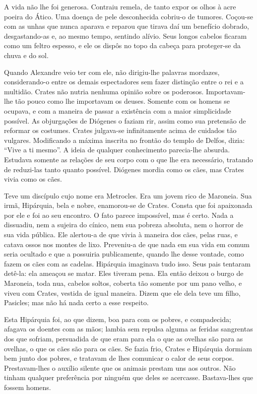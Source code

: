 A vida não lhe foi generosa. Contraiu remela, de tanto expor os olhos à
acre poeira do Ático. Uma doença de pele desconhecida cobriu-o de tumores.
Coçou-se com as unhas que nunca aparava e reparou que tirava daí um
benefício dobrado, desgastando-as e, ao mesmo tempo, sentindo alívio. Seus
longos cabelos ficaram como um feltro espesso, e ele os dispôs no topo da
cabeça para proteger-se da chuva e do sol.

Quando Alexandre veio ter com ele, não dirigiu-lhe palavras mordazes,
considerando-o entre os demais espectadores sem fazer distinção entre o
rei e a multidão. Crates não nutria nenhuma opinião sobre os poderosos.
Importavam-lhe tão pouco como lhe importavam os deuses. Somente com os
homens se ocupava, e com a maneira de passar a existência com a maior
simplicidade possível. As objurgações de Diógenes o faziam rir, assim como
sua pretensão de reformar os costumes. Crates julgava-se infinitamente
acima de cuidados tão vulgares. Modificando a máxima inscrita no frontão
do templo de Delfos, dizia: “Vive a ti mesmo”. A ideia de qualquer
conhecimento parecia-lhe absurda. Estudava somente as relações de seu
corpo com o que lhe era necessário, tratando de reduzi-las tanto quanto
possível. Diógenes mordia como os cães, mas Crates vivia como os cães.

Teve um discípulo cujo nome era Metrocles. Era um jovem rico de Maroneia.
Sua irmã, Hipárquia, bela e nobre, enamorou-se de Crates. Consta que foi
apaixonada por ele e foi ao seu encontro. O fato parece impossível, mas é
certo. Nada a dissuadiu, nem a sujeira do cínico, nem sua pobreza
absoluta, nem o horror de sua vida pública. Ele alertou-a de que vivia à
maneira dos cães, pelas ruas, e catava ossos nos montes de lixo.
Preveniu-a de que nada em sua vida em comum seria ocultado e que a
possuiria publicamente, quando lhe desse vontade, como fazem os cães com
as cadelas. Hipárquia imaginava tudo isso. Seus pais tentaram detê-la: ela
ameaçou se matar. Eles tiveram pena. Ela então deixou o burgo de Maroneia,
toda nua, cabelos soltos, coberta tão somente por um pano velho, e viveu
com Crates, vestida de igual maneira. Dizem que ele dela teve um filho,
Pasicles; mas não há nada certo a esse respeito.

Esta Hipárquia foi, ao que dizem, boa para com os pobres, e compadecida;
afagava os doentes com as mãos; lambia sem repulsa alguma as feridas
sangrentas dos que sofriam, persuadida de que eram para ela o que as
ovelhas são para as ovelhas, o que os cães são para os cães. Se fazia
frio, Crates e Hipárquia dormiam bem junto dos pobres, e tratavam de lhes
comunicar o calor de seus corpos. Prestavam-lhes o auxílio silente que os
animais prestam uns aos outros. Não tinham qualquer preferência por
ninguém que deles se acercasse. Bastava-lhes que fossem homens.

